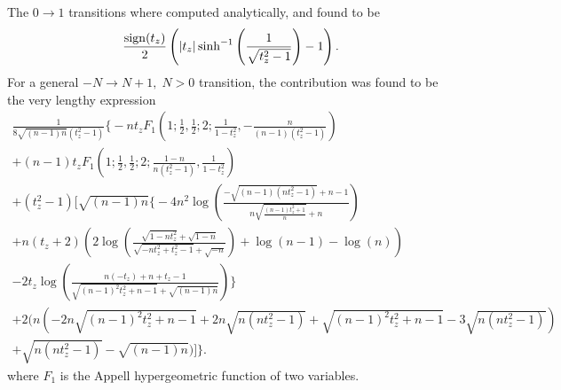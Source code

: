 The \( 0\to 1 \) transitions where computed analytically, and found to be
\begin{equation}
  \label{eq:117}
  \frac{\operatorname{sign}(t_z)}{2}
  \left(
  |t_z| \sinh^{-1}\left(\frac{1}{\sqrt{t_{z}^2-1} }\right) -1
\right  ).
\end{equation}
For a general \( -N \to N+1, \; N>0 \) transition, the contribution was found to be the very lengthy expression
\begin{multline}
  \frac{1}{8 \sqrt{(n-1) n} \left(t_z^2-1\right)}
  \Bigg\{
    -n t_z F_1\left(1;\frac{1}{2},\frac{1}{2};2;\frac{1}{1-t_z^2},-\frac{n}{(n-1)
        \left(t_z^2-1\right)}\right)\\
    +(n-1) t_z
    F_1\left(1;\frac{1}{2},\frac{1}{2};2;\frac{1-n}{n
        \left(t_z^2-1\right)},\frac{1}{1-t_z^2}\right)\\
    +\left(t_z^2-1\right)
    \Bigg[
      \sqrt{(n-1) n} \Big\{-4 n^2 \log \left(\frac{-\sqrt{(n-1) \left(n
                t_z^2-1\right)}+n-1}{n \sqrt{\frac{(n-1) t_z^2+1}{n}}+n}\right)\\
        +n (t_z+2)
        \left(2 \log \left(\frac{\sqrt{1-n t_z^2}+\sqrt{1-n}}{\sqrt{-n
                t_z^2+t_z^2-1}+\sqrt{-n}}\right)+\log (n-1)-\log (n)\right)\\
        -2 t_z \log
        \left(\frac{n (-t_z)+n+t_z-1}{\sqrt{(n-1)^2 t_z^2+n-1}+\sqrt{(n-1)
              n}}\right)\Big\}\\
      +2 \Big(n \left(-2 n \sqrt{(n-1)^2 t_z^2+n-1}+2 n \sqrt{n \left(n
              t_z^2-1\right)}+\sqrt{(n-1)^2 t_z^2+n-1}-3 \sqrt{n \left(n
              t_z^2-1\right)}\right)\\
        +\sqrt{n \left(n t_z^2-1\right)}-\sqrt{(n-1)
          n}\Big)
      \Bigg]
    \Bigg\}.
  \label{eq:130}
\end{multline}
where \( F_1 \) is the Appell hypergeometric function of two variables.


